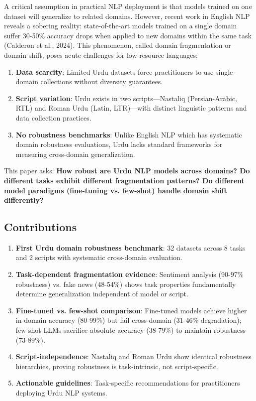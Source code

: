 \documentclass[10pt,twocolumn,journal]{IEEEtran}
\begin{document}
A critical assumption in practical NLP deployment is that models trained on one dataset will generalize to related domains. However, recent work in English NLP reveals a sobering reality: state-of-the-art models trained on a single domain suffer 30-50\% accuracy drops when applied to new domains within the same task (Calderon et al., 2024). This phenomenon, called domain fragmentation or domain shift, poses acute challenges for low-resource languages:

\begin{enumerate}
\item \textbf{Data scarcity}: Limited Urdu datasets force practitioners to use single-domain collections without diversity guarantees.
\item \textbf{Script variation}: Urdu exists in two scripts---Nastaliq (Persian-Arabic, RTL) and Roman Urdu (Latin, LTR)---with distinct linguistic patterns and data collection practices.
\item \textbf{No robustness benchmarks}: Unlike English NLP which has systematic domain robustness evaluations, Urdu lacks standard frameworks for measuring cross-domain generalization.
\end{enumerate}

This paper asks: \textbf{How robust are Urdu NLP models across domains? Do different tasks exhibit different fragmentation patterns? Do different model paradigms (fine-tuning vs. few-shot) handle domain shift differently?}

\subsection{Contributions}

\begin{enumerate}
\item \textbf{First Urdu domain robustness benchmark}: 32 datasets across 8 tasks and 2 scripts with systematic cross-domain evaluation.

\item \textbf{Task-dependent fragmentation evidence}: Sentiment analysis (90-97\% robustness) vs. fake news (48-54\%) shows task properties fundamentally determine generalization independent of model or script.

\item \textbf{Fine-tuned vs. few-shot comparison}: Fine-tuned models achieve higher in-domain accuracy (80-99\%) but fail cross-domain (31-46\% degradation); few-shot LLMs sacrifice absolute accuracy (38-79\%) to maintain robustness (73-89\%).

\item \textbf{Script-independence}: Nastaliq and Roman Urdu show identical robustness hierarchies, proving robustness is task-intrinsic, not script-specific.

\item \textbf{Actionable guidelines}: Task-specific recommendations for practitioners deploying Urdu NLP systems.
\end{enumerate}
\end{document}
